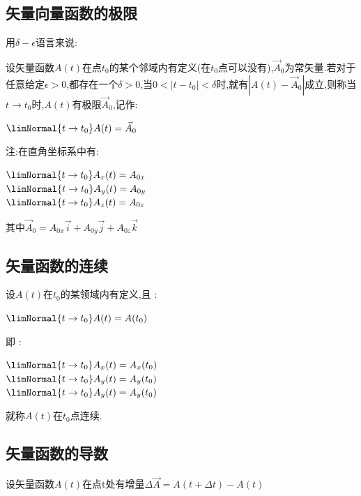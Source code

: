 {{{    \subsection{矢量向量函数的极限}{
      用$\delta-\epsilon$语言来说:

      设矢量函数$A(t)$在点$t_0$的某个邻域内有定义(在$t_0$点可以没有),$\vec{A}_0$为常矢量.若对于任意给定$\epsilon > 0$,都存在一个$\delta > 0$,当$0 < |t - t_0| < \delta$时,就有$|A(t) - \vec{A}_0|$成立,则称当$t \to t_0$时,$A(t)$有极限$\vec{A}_0$,记作:

      \begin{center}
        $\limNormal{t \to t_0}A(t) = \vec{A}_0$
      \end{center}

      注:在直角坐标系中有:

      \begin{center}
        $\limNormal{t \to t_0}A_x(t) = A_{0x}$ \\
        $\limNormal{t \to t_0}A_y(t) = A_{0y}$ \\
        $\limNormal{t \to t_0}A_z(t) = A_{0z}$
      \end{center}

      其中$\vec{A}_0 = A_{0x}\vec{i} + A_{0y}\vec{j} + A_{0z}\vec{k}$
    }%

    \subsection{矢量函数的连续}{
      设$A(t)$在$t_0$的某领域内有定义,且 :

      \begin{center}
        $\limNormal{t \to t_0}A(t) = A(t_0)$
      \end{center}

      即 :

      \begin{center}
        $\limNormal{t \to t_0}A_x(t) = A_x(t_0)$ \\
        $\limNormal{t \to t_0}A_y(t) = A_y(t_0)$ \\
        $\limNormal{t \to t_0}A_y(t) = A_y(t_0)$
      \end{center}

      就称$A(t)$在$t_0$点连续.
    }%

    \subsection{矢量函数的导数}{
      设矢量函数$A(t)$在点t处有增量$\Delta \vec{A} = A(t + \Delta t) - A(t)$

}}}}
